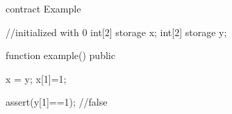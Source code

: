 \begin{soliditybox}
contract Example {
  //initialized with 0
  int[2] storage x;
  int[2] storage y;
          
  function example() public {
    x = y;
    x[1]=1;
   
    assert(y[1]==1); //false
  }
}
\end{soliditybox}